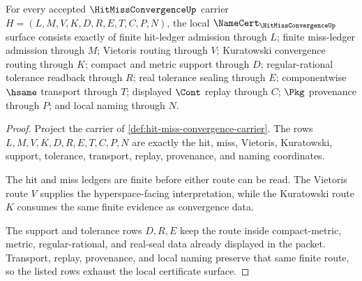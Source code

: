 \begin{theorem}
\label{thm:hit-miss-convergence-namecert-obligations}
For every accepted $\HitMissConvergenceUp$ carrier $H=(L,M,V,K,D,R,E,T,C,P,N)$, the local $\NameCert_{\HitMissConvergenceUp}$ surface consists exactly of finite hit-ledger admission through $L$; finite miss-ledger admission through $M$; Vietoris routing through $V$; Kuratowski convergence routing through $K$; compact and metric support through $D$; regular-rational tolerance readback through $R$; real tolerance sealing through $E$; componentwise $\hsame$ transport through $T$; displayed $\Cont$ replay through $C$; $\Pkg$ provenance through $P$; and local naming through $N$.
\end{theorem}
\begin{proof}
Project the carrier of \autoref{def:hit-miss-convergence-carrier}. The rows $L,M,V,K,D,R,E,T,C,P,N$ are exactly the hit, miss, Vietoris, Kuratowski, support, tolerance, transport, replay, provenance, and naming coordinates.

The hit and miss ledgers are finite before either route can be read. The Vietoris route $V$ supplies the hyperspace-facing interpretation, while the Kuratowski route $K$ consumes the same finite evidence as convergence data.

The support and tolerance rows $D,R,E$ keep the route inside compact-metric, metric, regular-rational, and real-seal data already displayed in the packet. Transport, replay, provenance, and local naming preserve that same finite route, so the listed rows exhaust the local certificate surface.
\end{proof}

